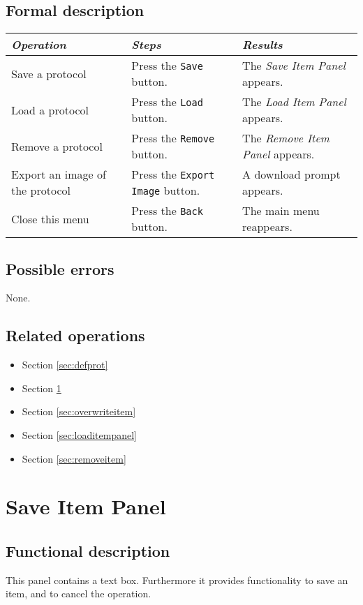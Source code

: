   \subsection*{Formal description}
    \begin{tabularx}{\textwidth}{XXX}
    \toprule
    \emph{Operation} & \emph{Steps} & \emph{Results} \\
    \midrule
    Save a protocol & Press the \texttt{Save} button. & The \emph{Save Item Panel} appears. \\
    \midrule
    Load a protocol & Press the \texttt{Load} button. & The \emph{Load Item Panel} appears. \\
    \midrule
    Remove a protocol & Press the \texttt{Remove} button. & The \emph{Remove Item Panel} appears. \\
    \midrule
    Export an image of the protocol & Press the \texttt{Export Image} button. & A download prompt appears. \\
    \midrule
    Close this menu & Press the \texttt{Back} button. & The main menu reappears. \\
    \bottomrule
  \end{tabularx}

  \subsection*{Possible errors}
  None.
  
  \subsection*{Related operations}
    \begin{itemize}
    \item Section \ref{sec:defprot}
    \item Section \ref{sec:saveitem}
    \item Section \ref{sec:overwriteitem}
    \item Section \ref{sec:loaditempanel}
    \item Section \ref{sec:removeitem}
  \end{itemize}

\section{Save Item Panel}
\label{sec:saveitem}
  \subsection*{Functional description}
  This panel contains a text box. Furthermore it provides functionality to save an item, and to cancel the operation.


